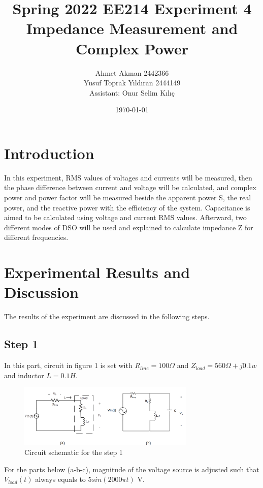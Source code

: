 \documentclass[letterpaper,12pt]{article}
\begin{document}
\thispagestyle{empty}

\title{Spring 2022 EE214 Experiment 4  \protect\\ Impedance Measurement and Complex Power}
\author{Ahmet Akman 2442366 \protect\\ Yusuf Toprak Yıldıran 2444149 \protect\\ Assistant: Onur Selim Kılıç}
\date{\today}
\maketitle
\tableofcontents
\section{Introduction}
In this experiment, RMS values of voltages and currents will be measured, then the phase difference between current and voltage will be calculated, and complex power and power factor will be measured beside the apparent power S, the real power, and the reactive power with the efficiency of the system. Capacitance is aimed to be calculated using voltage and current RMS values. Afterward, two different modes of DSO will be used and explained to calculate impedance Z for different frequencies.

\section{Experimental Results and Discussion}
The results of the experiment are discussed in the following steps.
%
\subsection{Step 1}

In this part, circuit in figure 1 is set with \(R_{line}= 100\Omega\) and \(Z_{load}= 560\Omega + j0.1w\) and inductor \(L= 0.1H\).
\begin{figure}[H]
    \centering
    \includegraphics[width = 0.75\textwidth]{1SCH.png}
    \caption{Circuit schematic for the step 1}
\end{figure} 
For the parts below (a-b-c), magnitude of the voltage source is adjusted such that \(V_{load}(t)\) always equals to \(5sin(2000\pi t)\) V. 
\end{document}
